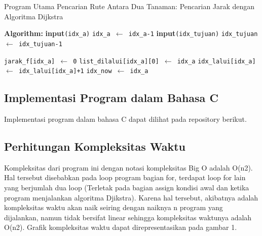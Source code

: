 \documentclass[conference]{IEEEtran}
\begin{document}
\begin{algorithm}
    \caption{Program Utama Pencarian Rute Antara Dua Tanaman: 
    Pencarian Jarak dengan Algoritma Dijkstra}\label{alg:six}
    \DontPrintSemicolon
    \textbf{Algorithm:}\;
    \textbf{input}\texttt{(idx\_a)}\;
    \texttt{idx\_a $\gets$ idx\_a-1}\;
    \textbf{input}\texttt{(idx\_tujuan)}\;
    \texttt{idx\_tujuan $\gets$ idx\_tujuan-1}\;

    \texttt{jarak\_f[idx\_a] $\gets$ 0}\;
    \texttt{list\_dilalui[idx\_a][0] $\gets$ idx\_a}\;
    \texttt{idx\_lalui[idx\_a] $\gets$ idx\_lalui[idx\_a]+1}\;
    \texttt{idx\_now $\gets$ idx\_a}\;
    \While{\texttt{idx\_now! = int\_max}}{
        \texttt{is\_final[idx\_now] $\gets$ \emph{TRUE}}\;
        \For{\texttt{i = 0 \textbf{to} n\_tanaman-1}}{
            \If{\texttt{!is\_final[i]} \textbf{and} \texttt{graph[idx\_now][i]! = int\_max} \textbf{and} 
            \texttt{(jarak\_f[idx\_now] + graph[idx\_now][i]) > jarak\_f[i]}}{
                \texttt{jarak\_f[i] $\gets$ (jarak\_f[idx\_now] + graph[idx\_now][i])};
                \texttt{idx\_lalui[i] $\gets$ idx\_lalui[idx\_now]+1}\;
            }
            \For{\texttt{j = 0} \textbf{to} \texttt{idx\_dilalui[i]-1}}{
                \eIf{\texttt{j=idx\_dilalui[i]-1}}{
                    \texttt{list\_dilalui[i][j] $\gets$ i}\; 
                }
                {
                    \texttt{list\_dilalui[i][j] $\gets$ list\_dilalui[idx\_now][j}
                }
            }
        }
        \texttt{idx\_now $\gets$ idx\_process(n\_tanaman, jarak\_f, is\_final)}
    }
\end{algorithm}

\subsection{Implementasi Program dalam Bahasa C}
Implementasi program dalam bahasa C dapat dilihat
pada repository berikut.

\subsection{Perhitungan Kompleksitas Waktu}
Kompleksitas dari program ini dengan notasi kompleksitas
Big O adalah O(n2). Hal tersebut disebabkan pada loop
program bagian for, terdapat loop for lain yang berjumlah
dua loop (Terletak pada bagian assign kondisi awal dan ketika
program menjalankan algoritma Djikstra). Karena hal tersebut,
akibatnya adalah kompleksitas waktu akan naik seiring dengan
naiknya n program yang dijalankan, namun tidak bersifat
linear sehingga kompleksitas waktunya adalah O(n2). Grafik
kompleksitas waktu dapat direpresentasikan pada gambar 1.
\end{document}
